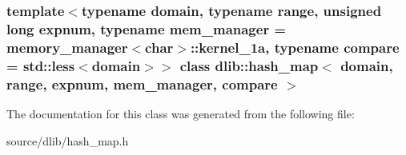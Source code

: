 \subsubsection*{template$<$typename domain, typename range, unsigned long expnum, typename mem\_\-manager = memory\_\-manager$<$char$>$::kernel\_\-1a, typename compare = std::less$<$domain$>$$>$ class dlib::hash\_\-map$<$ domain, range, expnum, mem\_\-manager, compare $>$}



The documentation for this class was generated from the following file:\begin{DoxyCompactItemize}
\item 
source/dlib/hash\_\-map.h\end{DoxyCompactItemize}
